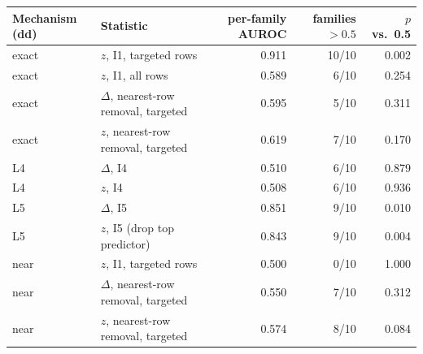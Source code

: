 \begin{tabular}{llrrr}\toprule
Mechanism (dd) & Statistic & per-family AUROC & families $>0.5$ & $p$ vs.\ 0.5\\\midrule
exact & $z$, I1, targeted rows & 0.911 & 10/10 & 0.002\\
exact & $z$, I1, all rows & 0.589 & 6/10 & 0.254\\
exact & $\Delta$, nearest-row removal, targeted & 0.595 & 5/10 & 0.311\\
exact & $z$, nearest-row removal, targeted & 0.619 & 7/10 & 0.170\\
L4 & $\Delta$, I4 & 0.510 & 6/10 & 0.879\\
L4 & $z$, I4 & 0.508 & 6/10 & 0.936\\
L5 & $\Delta$, I5 & 0.851 & 9/10 & 0.010\\
L5 & $z$, I5 (drop top predictor) & 0.843 & 9/10 & 0.004\\
near & $z$, I1, targeted rows & 0.500 & 0/10 & 1.000\\
near & $\Delta$, nearest-row removal, targeted & 0.550 & 7/10 & 0.312\\
near & $z$, nearest-row removal, targeted & 0.574 & 8/10 & 0.084\\
\bottomrule\end{tabular}

